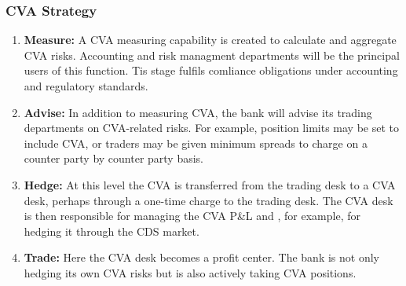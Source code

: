 \documentclass{article}
\theoremstyle{definition}
\theoremstyle{thrm}
\theoremstyle{lma}
\theoremstyle{ppst}
\theoremstyle{crlr}
\begin{document}
\subsubsection{CVA Strategy}
\begin{enumerate}
	\item \textbf{Measure:} A CVA measuring capability is created to calculate and aggregate CVA risks. Accounting and risk managment departments will be the principal users of this function. Tis stage fulfils comliance obligations under accounting and regulatory standards. 
	\item \textbf{Advise: } In addition to measuring CVA, the bank will advise its trading departments on CVA-related risks. For example, position limits may be set to include CVA, or traders may be given minimum spreads to charge on a counter party by counter party basis. 
	\item \textbf{Hedge: }At this level the CVA is transferred from the trading desk to a CVA desk, perhaps through a one-time charge to the trading desk. The CVA desk is then responsible for managing the CVA P\&L and , for example, for hedging it through the CDS market. 
	\item \textbf{Trade: }Here the CVA desk becomes a profit center. The bank is not only hedging its own CVA risks but is also actively taking CVA positions. 
\end{enumerate}
\end{document}

